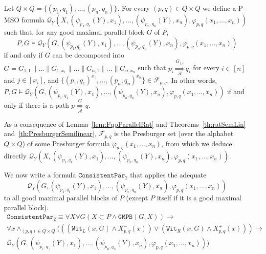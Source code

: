 \documentclass{CSML}
\begin{document}
Let $Q\times Q=\{(p_1,q_1),\dots,(p_n,q_n)\}$.
For every $(p,q)\in Q\times Q$ we define a P-MSO formula $\mathcal{Q}_Y(X,(\psi_{p_1,q_1}(Y),x_1),\dots,(\psi_{p_n,q_n}(Y),x_n),\varphi_{p,q}(x_1,\dots,x_n))$ such that, for any good maximal parallel block $G$ of $P$, 
$$P,G\models \mathcal{Q}_Y(G,(\psi_{p_1,q_1}(Y),x_1),\dots,(\psi_{p_n,q_n}(Y),x_n),\varphi_{p,q}(x_1,\dots,x_n))$$ 
if and only if $G$ can be decomposed into
$G=G_{1,1}\parallel\dots\parallel G_{1,x_1}\parallel\dots\parallel G_{n,1}\parallel\dots\parallel G_{n,x_n}$
such that $p_i \mathop{\Longrightarrow}\limits_{\mathcal{A}}^{G_{j,i}} q_i$ for every $i\in[n]$ and $j\in[x_i]$, and
$\{(p_1,q_1)^{x_1},\dots,(p_n,q_n)^{x_n}\}\in \mathcal{F}_{p,q}$.
In other words,
$P,G\models \mathcal{Q}_Y(G,(\psi_{p_1,q_1}(Y),x_1),\dots,(\psi_{p_n,q_n}(Y),x_n),\varphi_{p,q}(x_1,\dots,x_n))$
if and only if there is a path 
$p \mathop{\Longrightarrow}\limits_{\mathcal{A}}^{G} q$.

As a consequence of Lemma~\ref{lem:FqpParallelRat} and Theorems~\ref{th:ratSemLin} and~\ref{th:PresburgerSemilinear}, $\mathcal{F}_{p,q}$ is the Presburger set (over the alphabet $Q\times Q$) of some Presburger formula $\varphi_{p,q}(x_1,\dots,x_n)$, from which we deduce directly $\mathcal{Q}_Y(X,(\psi_{p_1,q_1}(Y),x_1),\dots,(\psi_{p_n,q_n}(Y),x_n),\varphi_{p,q}(x_1,\dots,x_n))$. 

We now write a formula $\texttt{ConsistentPar}_2$ that applies the adequate $$\mathcal{Q}_Y(G,(\psi_{p_1,q_1}(Y),x_1),\dots,(\psi_{p_n,q_n}(Y),x_n),\varphi_{p,q}(x_1,\dots,x_n))$$ to all good maximal parallel blocks of $P$ (except $P$ itself if it is a good maximal parallel block).
\begin{multline*}
  \texttt{ConsistentPar}_2\equiv \forall X\forall G (X\subset P\land\texttt{GMPB}(G,X))\rightarrow \\
  \forall x\mathop\land_{(p,q)\in Q\times Q}( ((\texttt{Wit}_L(x,G)\land X^-_{p,q}(x))\lor(\texttt{Wit}_R(x,G)\land X^+_{p,q}(x)))\rightarrow\\
  \mathcal{Q}_Y(G,(\psi_{p_1,q_1}(Y),x_1),\dots,(\psi_{p_n,q_n}(Y),x_n),\varphi_{p,q}(x_1,\dots,x_n)) )
\end{multline*}
\end{document}
